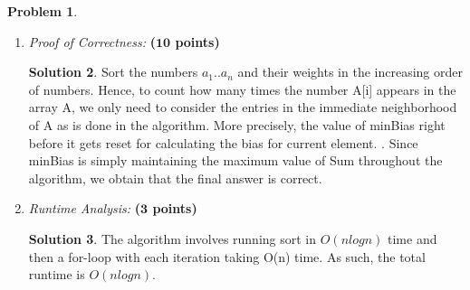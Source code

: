 \documentclass{article}
\theoremstyle{definition}
\newtheorem{problem}{Problem}
\newtheorem*{solution*}{Solution}
\newenvironment{solution}{\begin{solution*}}{{} \end{solution*}}
\newcommand{\grade}[1]{\hfill{\textbf{($\mathbf{#1}$ points)}}}
\begin{document}
\begin{problem}
\begin{enumerate}[label=(\alph*)]
\begin{solution}
	(f) Output the $minBias$. \\
	
	\end{solution}
	
		\newpage
		\item \emph{Proof of Correctness:} \grade{10}
		
		\bigskip	
	\begin{solution}
	
	Sort the numbers $a_1..a_n$ and their weights in the increasing order of numbers. Hence, to count how many times the number A[i] appears in the array A, we only need to consider the entries in the immediate neighborhood of A 	as is done in the algorithm. More precisely, the value of minBias right before it gets reset for calculating the bias for current element. . Since minBias is simply maintaining the maximum value of Sum throughout the algorithm, we 	obtain that the final answer is correct. 
	
	\end{solution}
	
	
		\item \emph{Runtime Analysis:} \grade{3}
		
		\bigskip	
		
		
	\begin{solution}
	
	The algorithm involves running sort in $O(n log n)$ time and then a for-loop with each iteration taking O(n) time. As such, the total runtime is $O(n log n)$.
	
	\end{solution}
	
		
	\end{enumerate}
\end{problem}
\newpage
\end{document}
